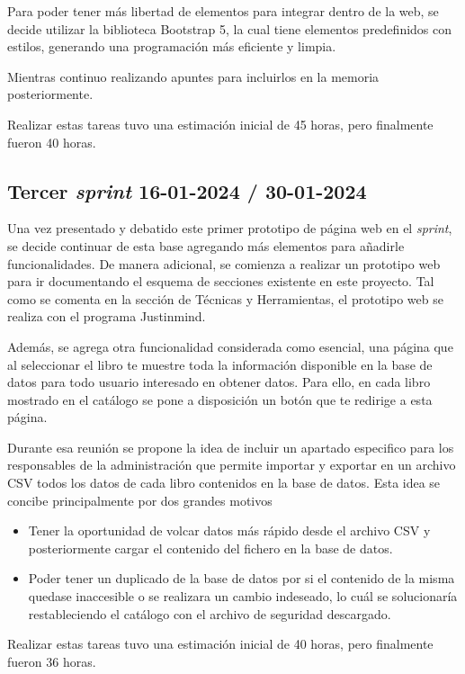 Para poder tener más libertad de elementos para integrar dentro de la web, se decide utilizar la biblioteca Bootstrap 5, la cual tiene elementos predefinidos con estilos, generando una programación más eficiente y limpia.

Mientras continuo realizando apuntes para incluirlos en la memoria posteriormente.

Realizar estas tareas tuvo una estimación inicial de 45 horas, pero finalmente fueron 40 horas.

\subsection{Tercer \textit{sprint} 16-01-2024 / 30-01-2024}

Una vez presentado y debatido este primer prototipo de página web en el \textit{sprint}, se decide continuar de esta base agregando más elementos para añadirle funcionalidades. De manera adicional, se comienza a realizar un prototipo web para ir documentando el esquema de secciones existente en este proyecto. Tal como se comenta en la sección de Técnicas y Herramientas,  el prototipo web se realiza con el programa Justinmind.

Además, se agrega otra funcionalidad considerada como esencial, una página que al seleccionar el libro te muestre toda la información disponible en la base de datos para todo usuario interesado en obtener datos.
Para ello, en cada libro mostrado en el catálogo se pone a disposición un botón que te redirige a esta página.

Durante esa reunión se propone la idea de incluir un apartado especifico para los responsables de la administración que permite importar y exportar en un archivo CSV todos los datos de cada libro contenidos en la base de datos. 
Esta idea se concibe principalmente por dos grandes motivos
\begin{itemize}
    \item Tener la oportunidad de volcar datos más rápido desde el archivo CSV y posteriormente cargar el contenido del fichero en la base de datos.
    \item Poder tener un duplicado de la base de datos por si el contenido de la misma quedase inaccesible o se realizara un cambio indeseado, lo cuál se solucionaría restableciendo el catálogo con el archivo de seguridad descargado.
\end{itemize}

Realizar estas tareas tuvo una estimación inicial de 40 horas, pero finalmente fueron 36     horas.

